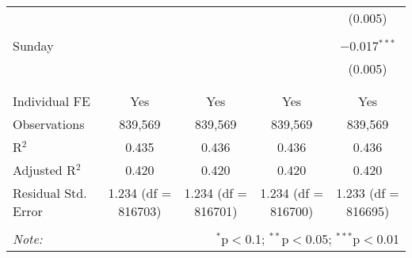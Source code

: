 \documentclass[
]{article}
\begin{document}
\begin{table}[!htbp]
{\begin{tabular}{@{\extracolsep{5pt}}lcccc}
  &  &  &  & (0.005) \\ 
  & & & & \\ 
 Sunday &  &  &  & $-$0.017$^{***}$ \\ 
  &  &  &  & (0.005) \\ 
  & & & & \\ 
\hline \\[-1.8ex] 
Individual FE & Yes & Yes & Yes & Yes \\ 
Observations & 839,569 & 839,569 & 839,569 & 839,569 \\ 
R$^{2}$ & 0.435 & 0.436 & 0.436 & 0.436 \\ 
Adjusted R$^{2}$ & 0.420 & 0.420 & 0.420 & 0.420 \\ 
Residual Std. Error & 1.234 (df = 816703) & 1.234 (df = 816701) & 1.234 (df = 816700) & 1.233 (df = 816695) \\ 
\hline 
\hline \\[-1.8ex] 
\textit{Note:}  & \multicolumn{4}{r}{$^{*}$p$<$0.1; $^{**}$p$<$0.05; $^{***}$p$<$0.01} \\ 
\end{tabular}
} 
\end{table} 
\newpage
\end{document}
